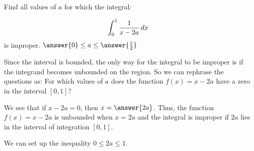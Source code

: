 \documentclass{ximera}
\author{Jim Talamo}
\begin{document}
\begin{exercise}
Find all values of $a$ for which the integral:

\[
\int_{0}^{1} \frac{1}{x-2a} \mathop{}\!d x
\]
 is improper.   $\answer{0} \leq a \leq \answer{\frac{1}{2}}$

\begin{hint}
Since the interval is bounded, the only way for the integral to be improper is if the integrand becomes unbounded on the region. So we can rephrase the questions as:
For which values of $a$ does the function $f(x) = x-2a$ have a zero in the interval $[0,1]$? 

We see that if $x-2a = 0$, then $x = \answer{2a}$.  Thus, the function $f(x) = x-2a$ is unbounded when $x=2a$ and the integral is improper if $2a$ lies in the interval of integration $[0,1]$.  

We can set up the inequality $0\leq 2a \leq 1$.  
\end{hint}

\end{exercise}
\end{document}
